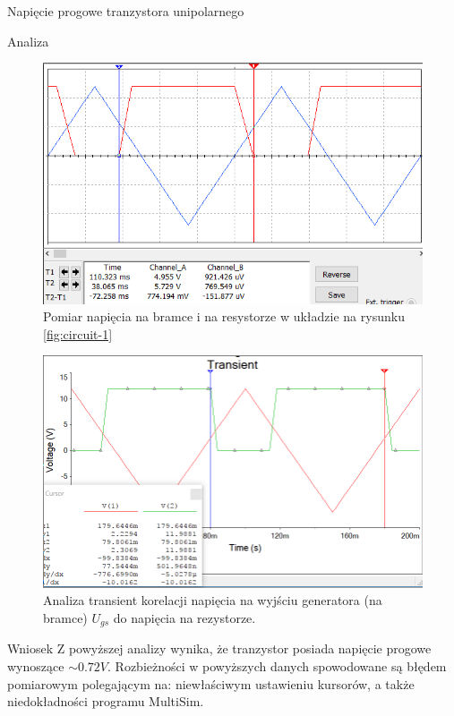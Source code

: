 \documentclass[a4paper]{scrartcl}
\begin{document}
\begin{section}{Napięcie progowe tranzystora unipolarnego}
\begin{subsection}{Analiza}
				\begin{figure}[ht]
				\begin{center}
					\includegraphics[width=0.7\linewidth]{exercise-1-osciloscope}
					\caption{Pomiar napięcia na bramce i na resystorze w układzie na rysunku \ref{fig:circuit-1}}
					\label{fig:circuit-1-osc}
				\end{center}
				\end{figure}

				\begin{figure}[!ht]
				\begin{center}
					\includegraphics[width=0.7\linewidth,scale=2]{exercise-1-transient}
					\caption{Analiza transient korelacji napięcia na wyjściu generatora (na bramce) $U_{gs}$ do napięcia na rezystorze.}
					\label{fig:circuit-1-transient}
				\end{center}
				\end{figure}
		\end{subsection}
		\begin{subsection}{Wniosek}
			Z powyższej analizy wynika, że tranzystor posiada napięcie progowe wynoszące $\sim0.72 V $. Rozbieżności w powyższych danych spowodowane są błędem pomiarowym polegającym na: niewłaściwym ustawieniu kursorów, a także niedokładności programu MultiSim.
		\end{subsection}
	\end{section}
\end{document}
